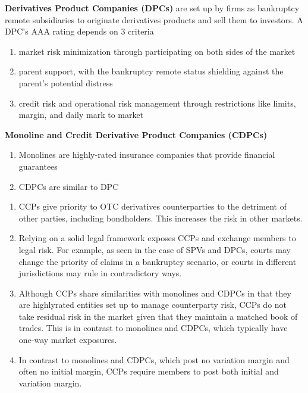 \documentclass[11pt,fleqn]{book} %
\numberwithin{equation}{section} %
\numberwithin{figure}{section} %
\numberwithin{table}{section} %
\begin{document}
 \begin{definition}\textbf{Derivatives Product Companies (DPCs)} are set up by firms as bankruptcy remote subsidiaries to originate derivatives products and sell them to investors. A DPC's AAA rating depends on 3 criteria
 \begin{enumerate}
     \item market risk minimization through participating on both sides of the market
     \item parent support, with the bankruptcy remote status shielding against the parent’s potential distress
     \item credit risk and operational risk management through restrictions like limits, margin, and daily mark to market
 \end{enumerate}
 \end{definition}
 \begin{definition}\textbf{Monoline and Credit Derivative Product Companies (CDPCs)}  
 \begin{enumerate}
     \item Monolines are highly-rated insurance companies that provide financial guarantees
     \item CDPCs are similar to DPC
 \end{enumerate}
 \end{definition}
 \begin{remark}
 \begin{enumerate}
     \item CCPs give priority to OTC derivatives counterparties to the detriment of other parties, including bondholders. This increases the risk in other markets.
     \item Relying on a solid legal framework exposes CCPs and exchange members to legal risk. For example, as seen in the case of SPVs and DPCs, courts may change the priority of claims in a bankruptcy scenario, or courts in different jurisdictions may rule in contradictory ways.
     \item Although CCPs share similarities with monolines and CDPCs in that they are highlyrated entities set up to manage counterparty risk, CCPs do not take residual risk in the market given that they maintain a matched book of trades. This is in contrast to monolines and CDPCs, which typically have one-way market exposures.
     \item In contrast to monolines and CDPCs, which post no variation margin and often no initial margin, CCPs require members to post both initial and variation margin.
 \end{enumerate}
 \end{remark}
\end{document}
